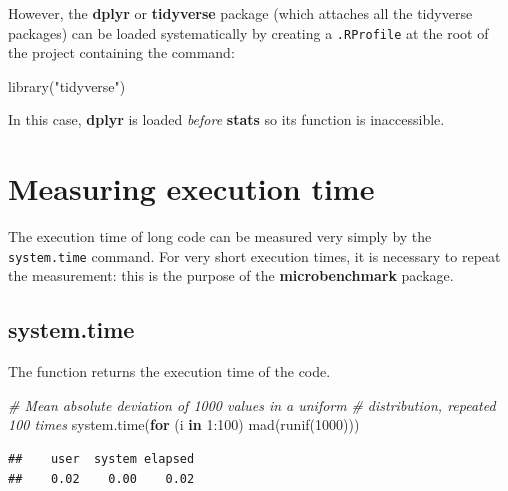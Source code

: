 \documentclass[
  12pt,
  american,
  a4paper,
  extrafontsizes,onecolumn,openright
  ]{memoir}
\newenvironment{Shaded}{\begin{snugshade}}{\end{snugshade}}
\newcommand{\CommentTok}[1]{\textcolor[rgb]{0.56,0.35,0.01}{\textit{#1}}}
\newcommand{\ControlFlowTok}[1]{\textcolor[rgb]{0.13,0.29,0.53}{\textbf{#1}}}
\newcommand{\DecValTok}[1]{\textcolor[rgb]{0.00,0.00,0.81}{#1}}
\newcommand{\FunctionTok}[1]{\textcolor[rgb]{0.00,0.00,0.00}{#1}}
\newcommand{\NormalTok}[1]{#1}
\newcommand{\SpecialCharTok}[1]{\textcolor[rgb]{0.00,0.00,0.00}{#1}}
\newcommand{\StringTok}[1]{\textcolor[rgb]{0.31,0.60,0.02}{#1}}
\begin{document}
However, the \textbf{dplyr} or \textbf{tidyverse} package (which attaches all the tidyverse packages) can be loaded systematically by creating a \texttt{.RProfile} at the root of the project containing the command:

\scriptsize

\begin{Shaded}
\begin{Highlighting}[]
\FunctionTok{library}\NormalTok{(}\StringTok{"tidyverse"}\NormalTok{)}
\end{Highlighting}
\end{Shaded}

\normalsize

In this case, \textbf{dplyr} is loaded \emph{before} \textbf{stats} so its function is inaccessible.

\hypertarget{measuring-execution-time}{%
\section{Measuring execution time}\label{measuring-execution-time}}

The execution time of long code can be measured very simply by the \texttt{system.time} command.
For very short execution times, it is necessary to repeat the measurement: this is the purpose of the \textbf{microbenchmark} package.

\hypertarget{system.time}{%
\subsection{system.time}\label{system.time}}

The function returns the execution time of the code.

\scriptsize

\begin{Shaded}
\begin{Highlighting}[]
\CommentTok{\# Mean absolute deviation of 1000 values in a uniform}
\CommentTok{\# distribution, repeated 100 times}
\FunctionTok{system.time}\NormalTok{(}\ControlFlowTok{for}\NormalTok{ (i }\ControlFlowTok{in} \DecValTok{1}\SpecialCharTok{:}\DecValTok{100}\NormalTok{) }\FunctionTok{mad}\NormalTok{(}\FunctionTok{runif}\NormalTok{(}\DecValTok{1000}\NormalTok{)))}
\end{Highlighting}
\end{Shaded}

\begin{verbatim}
##    user  system elapsed 
##    0.02    0.00    0.02
\end{verbatim}
\end{document}
